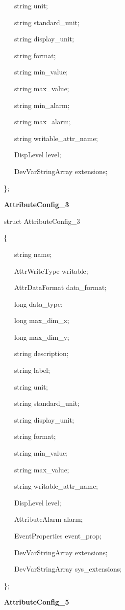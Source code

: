 ~~~string unit;

~~~string standard\_unit;

~~~string display\_unit;

~~~string format;

~~~string min\_value;

~~~string max\_value;

~~~string min\_alarm;

~~~string max\_alarm;

~~~string writable\_attr\_name;

~~~DispLevel level;

~~~DevVarStringArray extensions;

\};\\

\begin{flushleft}
\textbf{AttributeConfig\_3}
\par\end{flushleft}

struct AttributeConfig\_3

\{

~~~string name;

~~~AttrWriteType writable;

~~~AttrDataFormat data\_format;

~~~long data\_type;

~~~long max\_dim\_x;

~~~long max\_dim\_y;

~~~string description;

~~~string label;

~~~string unit;

~~~string standard\_unit;

~~~string display\_unit;

~~~string format;

~~~string min\_value;

~~~string max\_value;

~~~string writable\_attr\_name;

~~~DispLevel level;

~~~AttributeAlarm alarm;

~~~EventProperties event\_prop;

~~~DevVarStringArray extensions;

~~~DevVarStringArray sys\_extensions;

\};\\

\begin{flushleft}
\textbf{AttributeConfig\_5}
\par\end{flushleft}


